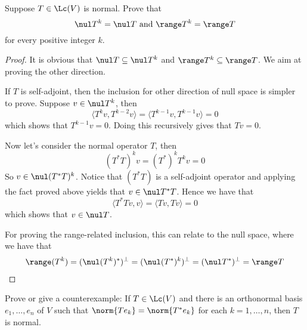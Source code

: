 \documentclass{extarticle}
\begin{document}
\begin{problem}{27}
    Suppose \(T \in \Lc(V)\) is normal. Prove that
    \[\nul T^k = \nul T \text{ and } \range T^k = \range T\]
    for every positive integer \(k\).
\end{problem}

\begin{proof}
It is obvious that \(\nul T \subseteq \nul T^k\) and \(\range T^k \subseteq
\range T\). We aim at proving the other direction.

If \(T\) is self-adjoint, then the inclusion for other direction of null space is simpler to prove.
Suppose \(v \in \nul T^k\), then
\[\langle T^k v, T^{k-2} v \rangle = \langle T^{k-1} v, T^{k-1}v \rangle = 0\]
which shows that \(T^{k-1} v= 0\). Doing this recursively gives that \(T v = 0\).

Now let's consider the normal operator \(T\), then
\[(T^* T)^k v = (T^*)^k T^k v = 0\]
So \(v \in \nul (T^* T)^k\). Notice that \((T^* T)\) is a self-adjoint operator and applying the fact
proved above yields that \(v \in \nul T^* T \). Hence we have that
\[\langle T^* Tv,v \rangle = \langle Tv, Tv \rangle = 0\]
which shows that \(v \in \nul T\).

For proving the range-related inclusion, this can relate to the null space, where we have that
\begin{align*}
    \range (T^k) = (\nul (T^k)^*)^\perp = (\nul (T^*)^k)^\perp = (\nul T^*)^\perp = \range T
\end{align*}
\end{proof}

\begin{problem}{29}
    Prove or give a counterexample: If \(T \in \Lc(V)\)  and there is an orthonormal
    basis \(e_1, \ldots, e_n\) of $V$ such that \(\norm{T e_k} = \norm{T^* e_k}\) for each
    \(k = 1, \ldots, n\), then $T$ is normal.
\end{problem}
\end{document}
